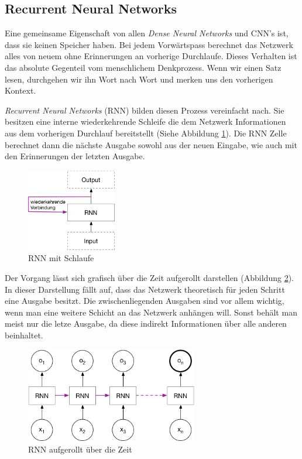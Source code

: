 \subsection{Recurrent Neural Networks}
Eine gemeinsame Eigenschaft von allen \textit{Dense Neural Networks} und CNN's ist, dass sie keinen Speicher haben. Bei jedem Vorwärtspass berechnet das Netzwerk alles von neuem ohne Erinnerungen an vorherige Durchlaufe. Dieses Verhalten ist das absolute Gegenteil vom menschlichem Denkprozess. Wenn wir einen Satz lesen, durchgehen wir ihn Wort nach Wort und merken uns den vorherigen Kontext.

\textit{Recurrent Neural Networks} (RNN) bilden diesen Prozess vereinfacht nach. Sie besitzen eine interne wiederkehrende Schleife die dem Netzwerk Informationen aus dem vorherigen Durchlauf bereitstellt (Siehe Abbildung \ref{img:rnn_loop}). Die RNN Zelle berechnet dann die nächste Ausgabe sowohl aus der neuen Eingabe, wie auch mit den Erinnerungen der letzten Ausgabe. \parencite{chollet}\\
\begin{figure}[hbt]
	\centering
		\includegraphics[width=0.35\textwidth]{assets/rnn_loop.png}
	\caption{RNN mit Schlaufe}
	\label{img:rnn_loop}
\end{figure}

Der Vorgang lässt sich grafisch über die Zeit aufgerollt darstellen (Abbildung \ref{img:rnn_unrolled}). In dieser Darstellung fällt auf, dass das Netzwerk theoretisch für jeden Schritt eine Ausgabe besitzt. Die zwischenliegenden Ausgaben sind vor allem wichtig, wenn man eine weitere Schicht an das Netzwerk anhängen will. Sonst behält man meist nur die letze Ausgabe, da diese indirekt Informationen über alle anderen beinhaltet.\\
\begin{figure}[hbt]
	\centering
		\includegraphics[width=0.67\textwidth]{assets/rnn_unrolled.png}
	\caption{RNN aufgerollt über die Zeit}
	\label{img:rnn_unrolled}
\end{figure}

